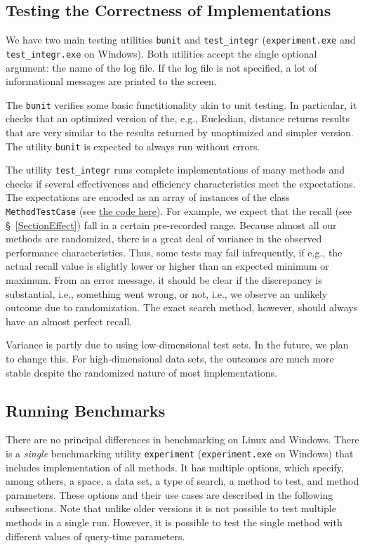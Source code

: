 \documentclass[runningheads,a4paper]{llncs}
\newcommand{\replocdir}{https://github.com/searchivarius/NonMetricSpaceLib/tree/pserv}
\newcommand{\ttt}[1]{\texttt{#1}}
\begin{document}
{\subsection{Testing the Correctness of Implementations}
We have two main testing utilities \ttt{bunit} and \ttt{test\_integr} (\ttt{experiment.exe} and
\ttt{test\_integr.exe} on Windows).
Both utilities accept the single optional argument: the name of the log file.
If the log file is not specified, a lot of informational messages are printed to the screen.

The \ttt{bunit} verifies some basic functitionality akin to unit testing.
In particular, it checks that an optimized version of the, e.g., Eucledian, distance
returns results that are very similar to the results returned by unoptimized and simpler version.
The utility \ttt{bunit} is expected to always run without errors.

The utility \ttt{test\_integr} runs complete implementations of many methods
and checks if several effectiveness and efficiency characteristics
meet the expectations.
The expectations are encoded as an array of instances of the class \ttt{MethodTestCase}
(see \href{\replocdir /similarity_search/test/test_integr.cc#L65}{the code here}).
For example, we expect that the recall (see \S~\ref{SectionEffect})
fall in a certain pre-recorded range.
Because almost all our methods are randomized, there is a great deal of variance
in the observed performance characteristics. Thus, some tests
may fail infrequently, if e.g., the actual recall value is slightly lower or higher 
than an expected minimum  or maximum.
From an error message, it should be clear if the discrepancy is substantial, i.e.,
something went wrong, or not, i.e., we observe an unlikely outcome due to randomization.
The exact search method, however, should always have an almost perfect recall.

Variance is partly due to using low-dimensional test sets. In the future, we plan to change this.
For high-dimensional data sets, the outcomes are much more stable despite the randomized nature
of most implementations.
\subsection{Running Benchmarks}\label{SectionRunBenchmark}
There are no principal differences in benchmarking on Linux and Windows.
There is a \emph{single} benchmarking utility 
\ttt{experiment} (\ttt{experiment.exe} on Windows) that includes implementation of all methods.
It has multiple options, which specify, among others, 
a space, a data set, a type of search, a method to test, and method parameters.
These options and their use cases are described in the following subsections.
Note that unlike older versions it is not possible to test multiple methods in a single run.
However, it is possible to test the single method with different values of query-time parameters.

}
\end{document}

